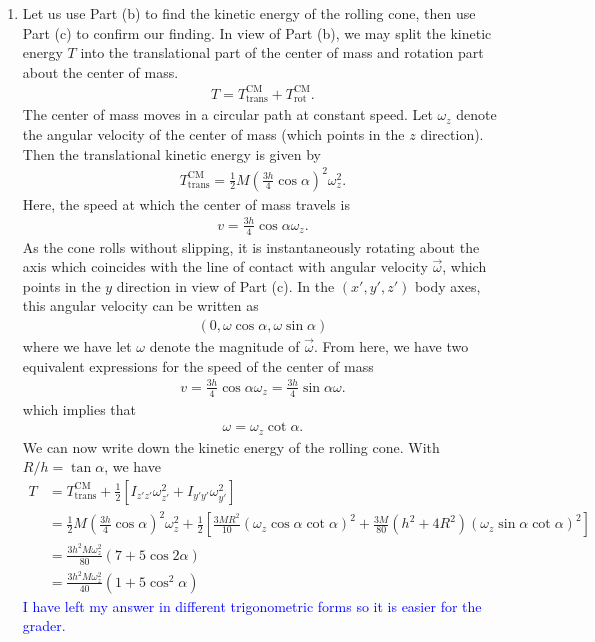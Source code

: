 \documentclass{article}
\theoremstyle{definition}
\newcommand{\al}{\alpha}
\newcommand{\f}[2]{\frac{#1}{#2}}
\newcommand{\lp}{\left(}
\newcommand{\rp}{\right)}
\newcommand{\lb}{\left[}
\newcommand{\rb}{\right]}
\begin{document}
\begin{enumerate}[label=(\alph*)]
	
	
	\item  Let us use Part (b) to find the kinetic energy of the rolling cone, then use Part (c) to confirm our finding. In view of Part (b), we may split the kinetic energy $T$ into the translational part of the center of mass and rotation part about the center of mass.  
	\begin{align*}
	T = T_{\text{trans}}^\text{CM} + T_{\text{rot}}^\text{CM}.
	\end{align*}
	The center of mass moves in a circular path at constant speed. Let $\omega_z$ denote the angular velocity of the center of mass (which points in the $z$ direction). Then the translational kinetic energy is given by 
	\begin{align*}
	T_{\text{trans}}^\text{CM}  = \f{1}{2} M \lp \f{3h}{4}\cos\al \rp^2 \omega_z^2.
	\end{align*}
	Here, the speed at which the center of mass travels is 
	\begin{align*}
	v = \f{3h}{4}\cos\al \omega_z.
	\end{align*}
	As the cone rolls without slipping, it is instantaneously rotating about the axis which coincides with the line of contact with angular velocity $\vec{\omega}$, which points in the $y$ direction in view of Part (c). In the $(x',y',z')$ body axes, this angular velocity can be written as
	\begin{align*}
	(0, \omega \cos\al, \omega \sin\al) 
	\end{align*}
	where we have let $\omega$ denote the magnitude of $\vec{\omega}$. From here, we have two equivalent expressions for the speed of the center of mass
	\begin{align*}
	v = \f{3h}{4}\cos\al \omega_z = \f{3h}{4}\sin\al \omega.
	\end{align*}
	which implies that
	\begin{align*}
	\omega = \omega_z \cot\al.
	\end{align*}
	We can now write down the kinetic energy of the rolling cone. With $R/h = \tan \al$, we have
	\begin{align*}
	T 
	&= T_{\text{trans}}^\text{CM} + \f{1}{2}\lb I_{z'z'}\omega_{z'}^2 + I_{y'y'} \omega_{y'}^2 \rb \\
	&= \f{1}{2} M \lp \f{3h}{4}\cos\al \rp^2 \omega_z^2 + \f{1}{2}\lb \f{3MR^2}{10}\lp \omega_z \cos\al\cot\al  \rp^2 + \f{3M}{80}\lp h^2 + 4R^2 \rp\lp  \omega_z \sin\al \cot\al \rp^2 \rb \\
	&= \boxed{\f{3h^2 M \omega_z^2}{80}\lp 7 + 5\cos 2\al \rp} \\
	&=  \boxed{\f{3h^2 M \omega_z^2}{40}\lp 1+5\cos^2\al \rp}
	\end{align*}
	\textcolor{blue}{I have left my answer in different trigonometric forms so it is easier for the grader.} 
	

\end{enumerate}
\end{document}
